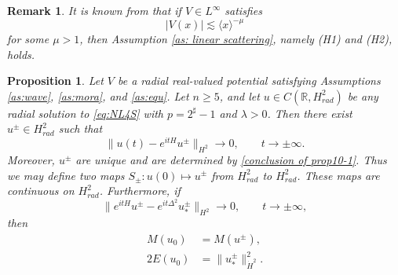 \documentclass[11pt,a4paper]{article}
\numberwithin{equation}{section}
\newtheorem{proposition}[theorem]{Proposition}
\newtheorem{remark}{Remark}[section]
\begin{document}
\begin{remark}\label{remark:scattering}
It is known from \cite{Kuroda} that if $V \in L^{\infty}$ satisfies
\[
|V(x)| \lesssim \langle x \rangle^{- \mu}
\]
for some $\mu > 1$, then Assumption \ref{as: linear scattering}, namely (H1) and (H2), holds.
\end{remark}

\begin{proposition}\label{scattering-2}
Let $V$ be a radial real-valued potential satisfying Assumptions \ref{as:wave}, \ref{as:mora}, and \ref{as:equ}. Let $n \geq 5$, and let $u \in C(\mathbb{R}, H^{2}_{rad})$ be any radial solution to \eqref{eq:NL4S} with $p = 2^{\sharp}-1$ and $\lambda > 0$.
Then there exist $u^{\pm} \in H^{2}_{rad}$ such that
\begin{equation}\label{conclusion of prop10-1}
\|u(t) - e^{itH}u^{\pm}\|_{H^{2}} \rightarrow 0,\qquad t \rightarrow \pm \infty.
\end{equation}
Moreover, $u^{\pm}$ are unique and are determined by \eqref{conclusion of prop10-1}.
Thus we may define two maps $S_{\pm} : u(0) \mapsto u^{\pm}$ from $H^{2}_{rad}$ to $H^{2}_{rad}$.
These maps are continuous on $H^{2}_{rad}$.
Furthermore, if
\[
 \|e^{itH}u^{\pm} - e^{it\Delta^{2}}u^{\pm}_{*}\|_{H^{2}} \rightarrow 0 , \qquad t \rightarrow \pm \infty,
\]
then
\begin{equation}\label{conclusion of prop10-2}
\begin{aligned}
M(u_{0}) &= M(u^{\pm}), \\
2E(u_{0}) &= \|u^{\pm}_{*}\|^{2}_{\dot{H}^{2}}.
\end{aligned}
\end{equation}
\end{proposition}
\end{document}
